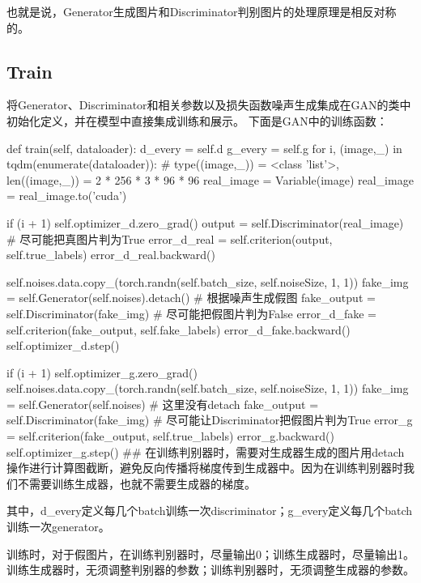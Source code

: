\documentclass[a4paper,AutoFakeBold,AutoFakeSlant]{ctexart}
\begin{document}
也就是说，Generator生成图片和Discriminator判别图片的处理原理是相反对称的。

\subsection{Train}
将Generator、Discriminator和相关参数以及损失函数噪声生成集成在GAN的类中初始化定义，并在模型中直接集成训练和展示。
下面是GAN中的训练函数：
\begin{python}
def train(self, dataloader):
  d_every = self.d
  g_every = self.g
  for i, (image,_) in tqdm(enumerate(dataloader)):       # type((image,_)) = <class 'list'>, len((image,_)) = 2 * 256 * 3 * 96 * 96
      real_image = Variable(image)
      real_image = real_image.to('cuda')

      if (i + 1) %
          self.optimizer_d.zero_grad()
          output = self.Discriminator(real_image)      # 尽可能把真图片判为True
          error_d_real = self.criterion(output, self.true_labels)
          error_d_real.backward()

          self.noises.data.copy_(torch.randn(self.batch_size, self.noiseSize, 1, 1))
          fake_img = self.Generator(self.noises).detach()       # 根据噪声生成假图
          fake_output = self.Discriminator(fake_img)       # 尽可能把假图片判为False
          error_d_fake = self.criterion(fake_output, self.fake_labels)
          error_d_fake.backward()
          self.optimizer_d.step()

      if (i + 1) %
          self.optimizer_g.zero_grad()
          self.noises.data.copy_(torch.randn(self.batch_size, self.noiseSize, 1, 1))
          fake_img = self.Generator(self.noises)        # 这里没有detach
          fake_output = self.Discriminator(fake_img)       # 尽可能让Discriminator把假图片判为True
          error_g = self.criterion(fake_output, self.true_labels)
          error_g.backward()
          self.optimizer_g.step()
          ## 在训练判别器时，需要对生成器生成的图片用detach操作进行计算图截断，避免反向传播将梯度传到生成器中。因为在训练判别器时我们不需要训练生成器，也就不需要生成器的梯度。
\end{python}

其中，d\_every定义每几个batch训练一次discriminator；g\_every定义每几个batch训练一次generator。

训练时，对于假图片，在训练判别器时，尽量输出0；训练生成器时，尽量输出1。训练生成器时，无须调整判别器的参数；训练判别器时，无须调整生成器的参数。
\end{document}

